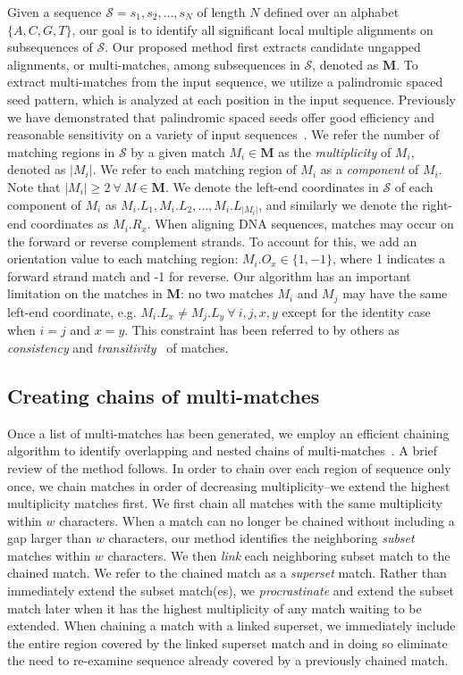 \documentclass{ws-procs9x6}
\begin{document}
Given a sequence $\mathcal{S}=s_1, s_2,\dots, s_N$ of length $N$
defined over an alphabet $\{A,C,G,T\}$, our goal is to identify all
significant local multiple alignments on subsequences of $\mathcal{S}$. Our
proposed method first extracts candidate ungapped alignments, or multi-matches,
among subsequences in $\mathcal{S}$, denoted as $\mathbf{M}$. To extract multi-matches from the input sequence, we utilize a palindromic spaced seed pattern, which is analyzed at each position in the input sequence.  Previously we have demonstrated that palindromic spaced seeds offer good efficiency and reasonable sensitivity on a variety of input sequences~\cite{ref-procrast}.
We refer the number of matching regions in $\mathcal{S}$
by a given match $M_i \in \mathbf{M}$ as the
\textit{multiplicity} of $M_i$, denoted as $|M_i|$. We refer to each
matching region of $M_i$ as a \textit{component} of $M_i$. Note that
$|M_i| \geq 2~\forall~M \in \mathbf{M}$.  We denote the left-end
coordinates in $\mathcal{S}$ of each component of $M_i$ as $M_i.L_1,
M_i.L_2,\dots, M_i.L_{|M_i|}$, and similarly we denote the right-end
coordinates as $M_i.R_x$.  When aligning DNA sequences, matches may
occur on the forward or reverse complement strands. To account for
this, we add an orientation value to each matching region:
$M_i.O_x \in \{1,-1\}$, where 1 indicates a forward strand match and
-1 for reverse. Our algorithm has an important limitation on the matches in
$\mathbf{M}$: no two matches $M_i$ and $M_j$ may have the same
left-end coordinate, e.g. $M_i.L_x \neq M_j.L_y~\forall~i, j, x, y$
except for the identity case when $i=j$ and $x=y$.  This constraint
has been referred to by others as \textit{consistency} and
\textit{transitivity}~\cite{ref-transitivity} of matches.

\subsection{Creating chains of multi-matches}

Once a list of multi-matches has been generated, we employ an efficient chaining algorithm to identify overlapping and nested chains of multi-matches~\cite{ref-procrast}. A brief review of the method follows.
In order to chain over each region of sequence only once,
we chain matches in order of decreasing multiplicity--we
extend the highest multiplicity matches first. We first chain all matches
with the same multiplicity within $w$
characters. When a match can no
longer be chained without including a gap larger than $w$
characters, our method identifies the neighboring \textit{subset}
matches within $w$ characters. We then \textit{link} each
neighboring subset match to the chained match. We refer to the
chained match as a \textit{superset} match. Rather than immediately
extend the subset match(es), we \textit{procrastinate} and extend
the subset match later when it has the highest multiplicity of any
match waiting to be extended. When chaining a match with a linked
superset, we immediately include the entire region covered by the linked superset
match and in doing so eliminate the need to re-examine sequence already covered by
a previously chained match.
\end{document}
